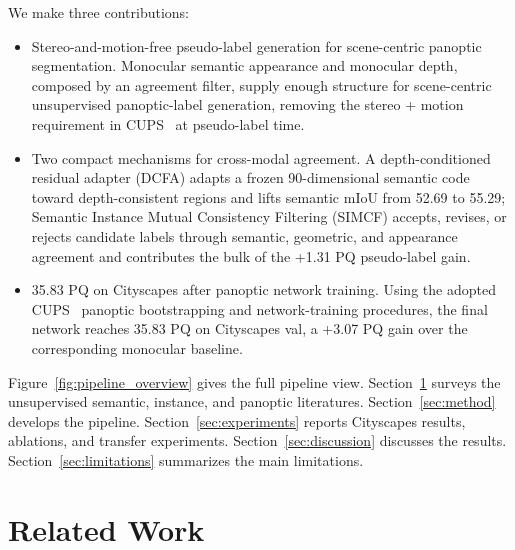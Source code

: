 \documentclass[10pt,twocolumn,letterpaper]{article}
\begin{document}
We make three contributions:
\begin{itemize}
\item Stereo-and-motion-free pseudo-label generation for scene-centric panoptic segmentation. Monocular semantic appearance and monocular depth, composed by an agreement filter, supply enough structure for scene-centric unsupervised panoptic-label generation, removing the stereo + motion requirement in CUPS~\cite{hahn2025cups} at pseudo-label time.
\item Two compact mechanisms for cross-modal agreement. A depth-conditioned residual adapter (DCFA) adapts a frozen 90-dimensional semantic code toward depth-consistent regions and lifts semantic mIoU from 52.69 to 55.29; Semantic Instance Mutual Consistency Filtering (SIMCF) accepts, revises, or rejects candidate labels through semantic, geometric, and appearance agreement and contributes the bulk of the +1.31 PQ pseudo-label gain.
\item 35.83 PQ on Cityscapes after panoptic network training. Using the adopted CUPS~\cite{hahn2025cups} panoptic bootstrapping and network-training procedures, the final network reaches 35.83 PQ on Cityscapes val, a +3.07 PQ gain over the corresponding monocular baseline.
\end{itemize}

Figure~\ref{fig:pipeline_overview} gives the full pipeline view. Section~\ref{sec:related} surveys the unsupervised semantic, instance, and panoptic literatures. Section~\ref{sec:method} develops the pipeline. Section~\ref{sec:experiments} reports Cityscapes results, ablations, and transfer experiments. Section~\ref{sec:discussion} discusses the results. Section~\ref{sec:limitations} summarizes the main limitations.

\section{Related Work}
\label{sec:related}
\end{document}
